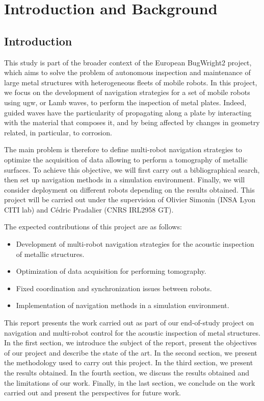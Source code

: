 
\chapter{Introduction and Background}

\section{Introduction}

This study is part of the broader context of the European BugWright2 project, which aims to solve the problem of autonomous inspection and maintenance of large metal structures with heterogeneous fleets of mobile robots.
In this project, we focus on the development of navigation strategies for a set of mobile robots using \gls{ugw}, or Lamb waves, to perform the inspection of metal plates.
Indeed, guided waves have the particularity of propagating along a plate by interacting with the material that composes it, and by being affected by changes in geometry related, in particular, to corrosion.

The main problem is therefore to define multi-robot navigation strategies to optimize the acquisition of data allowing to perform a tomography of metallic surfaces.
To achieve this objective, we will first carry out a bibliographical search, then set up navigation methods in a simulation environment.
Finally, we will consider deployment on different robots depending on the results obtained.
This project will be carried out under the supervision of Olivier Simonin (INSA Lyon CITI lab) and Cédric Pradalier (CNRS IRL2958 GT).

The expected contributions of this project are as follows:
\begin{itemize}
	\item Development of multi-robot navigation strategies for the acoustic inspection of metallic structures.
	\item Optimization of data acquisition for performing tomography.
	\item Fixed coordination and synchronization issues between robots.
	\item Implementation of navigation methods in a simulation environment.
\end{itemize}

This report presents the work carried out as part of our end-of-study project on navigation and multi-robot control for the acoustic inspection of metal structures.
In the first section, we introduce the subject of the report, present the objectives of our project and describe the state of the art.
In the second section, we present the methodology used to carry out this project.
In the third section, we present the results obtained.
In the fourth section, we discuss the results obtained and the limitations of our work.
Finally, in the last section, we conclude on the work carried out and present the perspectives for future work.

